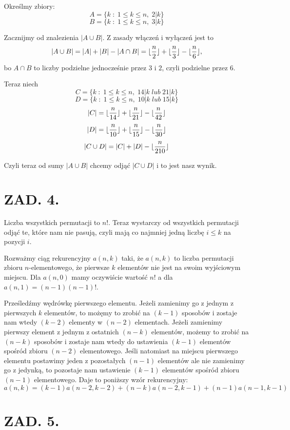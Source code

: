 \documentclass{article}[13pt]
\begin{document}
Określmy zbiory:
$$A=\{k\;:\;1\leq k\leq n,\; 2 | k\}$$
$$B=\{k\;:\;1\leq k\leq n,\; 3 | k\}$$

Zacznijmy od znalezienia $|A\cup B|$. Z zasady włączeń i wyłączeń jest to
$$|A\cup B|=|A|+|B|-|A\cap B|=\lfloor{n\over 2}\rfloor+\lfloor{n\over 3}\rfloor-\lfloor{n\over 6}\rfloor,$$
bo $A\cap B$ to liczby podzielne jednocześnie przez $3$ i $2$, czyli podzielne przez $6$.
\medskip

Teraz niech
$$C=\{k\;:\;1\leq k\leq n,\; 14 | k\;lub\;21 | k\}$$
$$D=\{k\;:\;1\leq k\leq n,\; 10 | k\;lub\;15 | k\}$$
$$|C|=\lfloor{n\over 14}\rfloor+\lfloor{n\over 21}\rfloor -\lfloor{n\over 42}\rfloor$$
$$|D|=\lfloor{n\over 10}\rfloor+\lfloor{n\over15}\rfloor-\lfloor{n\over 30}\rfloor$$
$$|C\cup D|=|C|+|D|-\lfloor{n\over 210}\rfloor$$

Czyli teraz od sumy $|A\cup B|$ chcemy odjąć $|C\cup D|$ i to jest nasz wynik.


\section*{ZAD. 4.}

Liczba wszystkich permutacji to $n!$. Teraz wystarczy od wszystkich permutacji odjąć te, które nam nie pasują, czyli mają co najmniej jedną liczbę $i\leq k$ na pozycji $i$.

Rozważmy ciąg rekurencyjny $a(n, k)$ taki, że $a(n, k)$ to liczba permutacji zbioru $n$-elementowego, że pierwsze $k$ elementów nie jest na swoim wyjściowym miejscu. Dla $a(n, 0)$ mamy oczywiście wartość $n!$ a dla $a(n, 1)=(n-1)(n-1)!$.

Prześledźmy wędrówkę pierwszego elementu. Jeżeli zamienimy go z jednym z pierwszych $k$ elementów, to możęmy to zrobić na $(k-1)$ sposobów i zostaje nam wtedy $(k-2)$ elementy w $(n-2)$ elementach. Jeżeli zamienimy pierwszy element z jednym z ostatnich $(n-k)$ elementów, możemy to zrobić na $(n-k)$ sposobów i zostaje nam wtedy do ustawienia $(k-1)$ elementów spośród zbioru $(n-2)$ elementowego. Jeśli natomiast na miejscu pierwszego elementu postawimy jeden z pozostałych $(n-1)$ elementów ale nie zamienimy go z jedynką, to pozostaje nam ustawienie $(k-1)$ elementów spośród zbioru $(n-1)$ elementowego. Daje to poniższy wzór rekurencyjny:
$$a(n, k)=(k-1)a(n-2, k-2)+(n-k)a(n-2, k-1)+(n-1)a(n-1, k-1)$$

\section*{ZAD. 5.}
\end{document}
